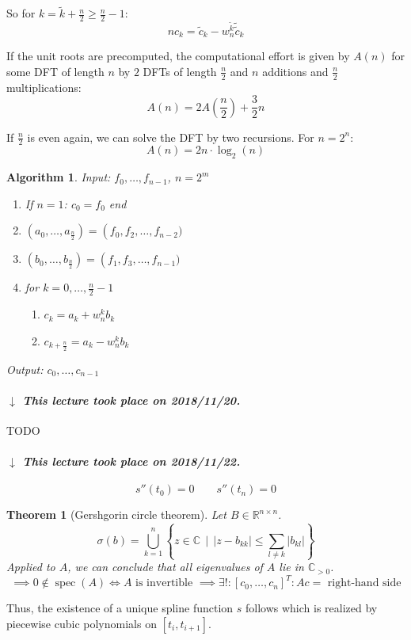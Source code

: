 \documentclass[a4paper]{article}
\newcounter{lecref}[section]
\numberwithin{lecref}{section}
\theoremstyle{break}
\newtheorem{thm}[lecref]{Theorem}
\newtheorem{algorithm}{Algorithm}
\newcommand{\dateref}[1]{%
  \begin{mdframed}[backgroundcolor=gray!10,innerbottommargin=0pt,innertopmargin=0pt]
    \paragraph{\textit{$\downarrow$ This lecture took place on #1.}}%
  \end{mdframed}%
}
\newcommand{\Abs}[1]{\left|#1\right|}
\newcommand{\SetDef}[2]{\left\{#1\,\mid\,#2\right\}}
\DeclareMathOperator{\spec}{spec}
\begin{document}
So for $k = \tilde k + \frac n2 \geq \frac n2 - 1$:
\[ nc_k = \tilde c_k - w_n^{\tilde k} \tilde{\tilde{c}}_k \]

If the unit roots are precomputed, the computational effort is given by $A(n)$ for some DFT of length $n$ by $2$ DFTs of length $\frac n2$ and $n$ additions and $\frac n2$ multiplications:
\[ A(n) = 2A(\frac n2) + \frac 32 n \]

If $\frac n2$ is even again, we can solve the DFT by two recursions. For $n = 2^n$:
\[ A(n) = 2n \cdot \log_2(n) \]

\begin{algorithm}
  \emph{Input:} $f_0, \dots, f_{n-1}$, $n = 2^m$
  \begin{enumerate}
    \item If $n = 1$: $c_0 = f_0$ end
    \item $(a_0, \dots, a_{\frac n2}) = \operatorname(f_0, f_2, \dots, f_{n-2})$
    \item $(b_0, \dots, b_{\frac n2}) = \operatorname(f_1, f_3, \dots, f_{n-1})$
    \item for $k = 0, \dots, \frac n2 - 1$
      \begin{enumerate}
        \item $c_k = a_k + w_n^k b_k$
        \item $c_{k + \frac n2} = a_k - w_n^k b_k$
      \end{enumerate}
  \end{enumerate}
  \emph{Output:} $c_0, \dots, c_{n-1}$
\end{algorithm}

\dateref{2018/11/20}

TODO

\dateref{2018/11/22}

\[ s''(t_0) = 0 \qquad s''(t_n) = 0 \]

\begin{thm}[Gershgorin circle theorem]
  Let $B \in \mathbb R^{n \times n}$.
  \[ \sigma(b) = \bigcup_{k=1}^n \SetDef{z \in \mathbb C}{\Abs{z - b_{kk}} \leq \sum_{l \neq k} \Abs{b_{kl}}} \]
  Applied to $A$, we can conclude that all eigenvalues of $A$ lie in $\mathbb C_{> 0}$.
  \[ \implies 0 \not\in \spec(A) \iff A \text{ is invertible } \implies \exists!: [c_0, \dots, c_n]^T: Ac = \text{ right-hand side} \]
\end{thm}

Thus, the existence of a unique spline function $s$ follows which is realized by piecewise cubic polynomials on $[t_i, t_{i+1}]$.
\end{document}
